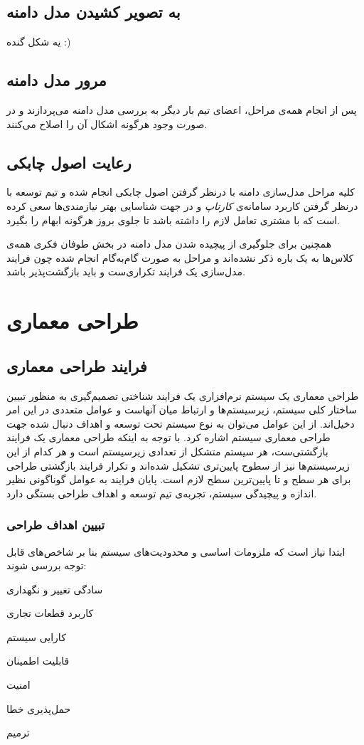 \documentclass[12pt,svgnames,oneside]{book}
\newcounter{itemadded}
\let\LaTeXStandardEnumerateBegin\enumerate
\let\LaTeXStandardEnumerateEnd\endenumerate
\renewenvironment{enumerate}{%
	\LaTeXStandardEnumerateBegin%
	\setcounter{itemadded}{0}
}{%
	\LaTeXStandardEnumerateEnd%
}%
\begin{document}
		\section{به تصویر کشیدن مدل دامنه}
			یه شکل گنده :)
		\section{مرور مدل دامنه}
			پس از انجام همه‌ی مراحل، اعضای تیم بار دیگر به بررسی مدل دامنه می‌پردازند و در صورت وجود هرگونه اشکال آن را اصلاح می‌کنند.
			
		\section{رعایت اصول چابکی}
			کلیه مراحل مدل‌سازی دامنه با درنظر گرفتن اصول چابکی انجام شده و تیم توسعه با درنظر گرفتن کاربرد سامانه‌ی \textit{کارتاپ} و در جهت شناسایی بهتر نیازمندی‌ها سعی کرده است که با مشتری تعامل لازم را داشته باشد تا جلوی بروز هرگونه ابهام را بگیرد.
			
			همچنین برای جلوگیری از پیچیده‌ شدن مدل دامنه در بخش طوفان فکری همه‌ی کلاس‌ها به یک باره ذکر نشده‌اند و مراحل به صورت گام‌به‌گام انجام شده چون فرایند مدل‌سازی یک فرایند تکراری‌ست و باید بازگشت‌پذیر باشد.
		
	\chapter{طراحی معماری}
		\section{فرایند طراحی معماری}
			طراحی معماری یک سیستم نرم‌افزاری یک فرایند شناختی تصمیم‌گیری به منظور تبیین ساختار کلی سیستم، زیرسیستم‌ها و ارتباط میان آنهاست و عوامل متعددی در این امر دخیل‌اند. از این عوامل می‌توان به نوع سیستم تحت توسعه و اهداف دنبال شده جهت طراحی معماری سیستم اشاره کرد. با توجه به اینکه طراحی معماری یک فرایند بازگشتی‌ست، هر سیستم متشکل از تعدادی زیرسیستم است و هر کدام از این زیرسیستم‌ها نیز از سطوح پایین‌تری تشکیل شده‌اند و تکرار فرایند بازگشتی طراحی برای هر سطح و تا پایین‌ترین سطح لازم است. پایان فرایند به عوامل گوناگونی نظیر اندازه و پیچیدگی سیستم، تجربه‌ی تیم توسعه و اهداف طراحی بستگی دارد.
			
			\subsection{تبیین اهداف طراحی}
				ابتدا نیاز است که ملزومات اساسی و محدودیت‌های سیستم بنا بر شاخص‌های قابل توجه بررسی شوند:
				\begin{enumerate}
					\item سادگی تغییر و نگهداری
					\item کاربرد قطعات تجاری
					\item کارایی سیستم
					\item قابلیت اطمینان
					\item امنیت
					\item حمل‌پذیری خطا
					\item ترمیم
				\end{enumerate}
				
\end{document}
